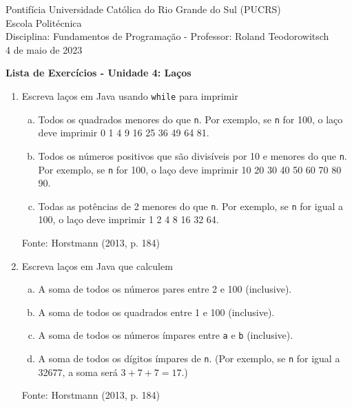 \documentclass[onecolumn,a4paper,10pt]{report}
\newcommand{\+}{\, + \,}
\newcommand{\<}{\hspace*{-0.4cm}}
\begin{document}
\singlespacing

\begin{center}
Pontifícia Universidade Católica do Rio Grande do Sul (PUCRS)\\
Escola Politécnica\\
Disciplina: Fundamentos de Programação - Professor: Roland Teodorowitsch\\
4 de maio de 2023
\end{center}

\begin{center}
\textbf{Lista de Exercícios - Unidade 4: Laços}
\end{center}

\begin{enumerate}[1.]

\item Escreva laços em Java usando \texttt{while} para imprimir
\begin{enumerate}[a)]
	\item Todos os quadrados menores do que \texttt{n}. Por exemplo, se \texttt{n} for 100, o laço deve imprimir 0 1 4 9 16 25 36 49 64 81.
	\item Todos os números positivos que são divisíveis por 10 e menores do que \texttt{n}. Por exemplo, se \texttt{n} for 100, o laço deve imprimir 10 20 30 40 50 60 70 80 90.
	\item Todas as potências de 2 menores do que \texttt{n}. Por exemplo, se \texttt{n} for igual a 100, o laço deve imprimir 1 2 4 8 16 32 64.
\end{enumerate}
{\tiny Fonte: Horstmann (2013, p. 184)}

\item Escreva laços em Java que calculem
\begin{enumerate}[a)]
	\item A soma de todos os números pares entre 2 e 100 (inclusive).
	\item A soma de todos os quadrados entre 1 e 100 (inclusive).
	\item A soma de todos os números ímpares entre \texttt{a} e \texttt{b} (inclusive).
	\item A soma de todos os dígitos ímpares de \texttt{n}. (Por exemplo, se \texttt{n} for igual a 32677, a soma será $3 + 7 + 7 = 17$.)
\end{enumerate}
{\tiny Fonte: Horstmann (2013, p. 184)}


\end{enumerate}
\end{document}
